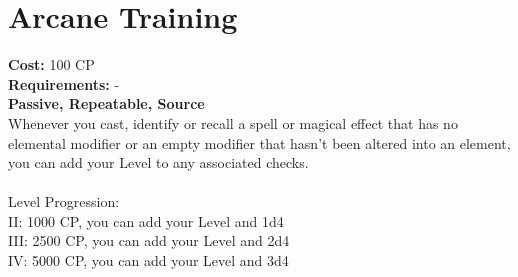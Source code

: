 \section{Arcane Training}
\textbf{Cost:} 100 CP\\
\textbf{Requirements:} -\\
\textbf{Passive, Repeatable, Source}\\
Whenever you cast, identify or recall a spell or magical effect that has no elemental modifier or an empty modifier that hasn't been altered into an element, you can add your Level to any associated checks.\\
\\
Level Progression:\\
II: 1000 CP, you can add your Level and 1d4\\
III: 2500 CP, you can add your Level and 2d4\\
IV: 5000 CP, you can add your Level and 3d4\\